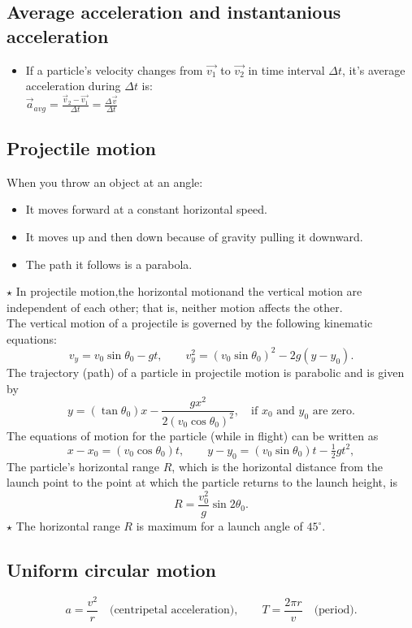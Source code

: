 \subsection{Average acceleration and instantanious acceleration}
\begin{itemize}
    \item If a particle's velocity changes from $\vec{v_1}$ to $\vec{v_2}$ in time interval $\Delta t$, it's average acceleration during $\Delta t$ is:\\ $\vec{a}_{avg} = \frac{\vec{v}_2 - \vec{v_1}}{\Delta t} = \frac{\Delta\vec{v}}{\Delta t}$
\end{itemize}

\subsection{Projectile motion}
When you throw an object at an angle:
\begin{itemize}
    \item It moves forward at a constant horizontal speed.
    \item It moves up and then down because of gravity pulling it downward.
    \item The path it follows is a parabola.
\end{itemize}
$\star$ In projectile motion,the horizontal motionand the vertical motion are independent of each other; that is, neither motion affects the other.\\
The vertical motion of a projectile is governed by the following kinematic equations:
\[
v_y = v_0 \sin \theta_0 - gt, \qquad
v_y^2 = (v_0 \sin \theta_0)^2 - 2g(y - y_0).
\]
The trajectory (path) of a particle in projectile motion is parabolic and is given by
\[
y = (\tan \theta_0)x - \frac{g x^2}{2 (v_0 \cos \theta_0)^2}, \quad \text{if } x_0 \text{ and } y_0 \text{ are zero.}
\]
The equations of motion for the particle (while in flight) can be written as
\[
x - x_0 = (v_0 \cos \theta_0)t, \qquad
y - y_0 = (v_0 \sin \theta_0)t - \tfrac{1}{2} g t^2,
\]
The particle's horizontal range $R$, which is the horizontal distance from the launch point to the point at which the particle returns to the launch height, is
\[
R = \frac{v_0^2}{g} \sin 2\theta_0.
\]
$\star$ The horizontal range $R$ is maximum for a launch angle of $45^\circ$.

\subsection{Uniform circular motion}
\[
a = \frac{v^2}{r} \quad \text{(centripetal acceleration)}, \qquad
T = \frac{2\pi r}{v} \quad \text{(period).}
\]

